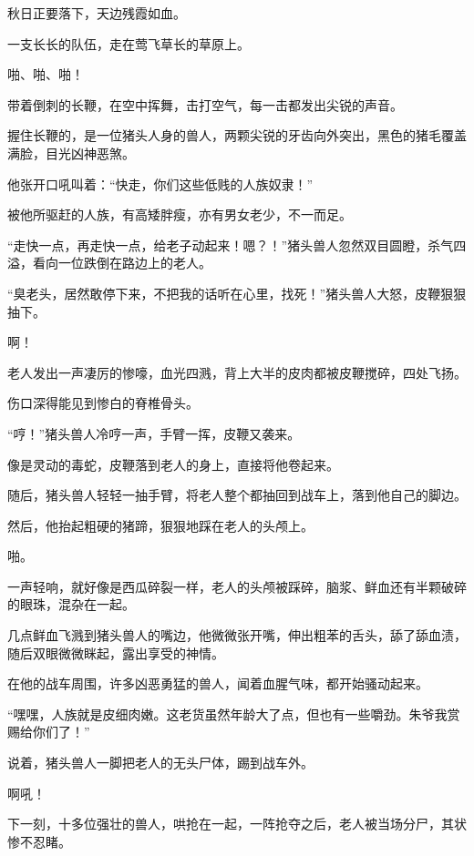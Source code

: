 
\begin{this_body}

秋日正要落下，天边残霞如血。

一支长长的队伍，走在莺飞草长的草原上。

啪、啪、啪！

带着倒刺的长鞭，在空中挥舞，击打空气，每一击都发出尖锐的声音。

握住长鞭的，是一位猪头人身的兽人，两颗尖锐的牙齿向外突出，黑色的猪毛覆盖满脸，目光凶神恶煞。

他张开口吼叫着：“快走，你们这些低贱的人族奴隶！”

被他所驱赶的人族，有高矮胖瘦，亦有男女老少，不一而足。

“走快一点，再走快一点，给老子动起来！嗯？！”猪头兽人忽然双目圆瞪，杀气四溢，看向一位跌倒在路边上的老人。

“臭老头，居然敢停下来，不把我的话听在心里，找死！”猪头兽人大怒，皮鞭狠狠抽下。

啊！

老人发出一声凄厉的惨嚎，血光四溅，背上大半的皮肉都被皮鞭搅碎，四处飞扬。

伤口深得能见到惨白的脊椎骨头。

“哼！”猪头兽人冷哼一声，手臂一挥，皮鞭又袭来。

像是灵动的毒蛇，皮鞭落到老人的身上，直接将他卷起来。

随后，猪头兽人轻轻一抽手臂，将老人整个都抽回到战车上，落到他自己的脚边。

然后，他抬起粗硬的猪蹄，狠狠地踩在老人的头颅上。

啪。

一声轻响，就好像是西瓜碎裂一样，老人的头颅被踩碎，脑浆、鲜血还有半颗破碎的眼珠，混杂在一起。

几点鲜血飞溅到猪头兽人的嘴边，他微微张开嘴，伸出粗苯的舌头，舔了舔血渍，随后双眼微微眯起，露出享受的神情。

在他的战车周围，许多凶恶勇猛的兽人，闻着血腥气味，都开始骚动起来。

“嘿嘿，人族就是皮细肉嫩。这老货虽然年龄大了点，但也有一些嚼劲。朱爷我赏赐给你们了！”

说着，猪头兽人一脚把老人的无头尸体，踢到战车外。

啊吼！

下一刻，十多位强壮的兽人，哄抢在一起，一阵抢夺之后，老人被当场分尸，其状惨不忍睹。


\end{this_body}
